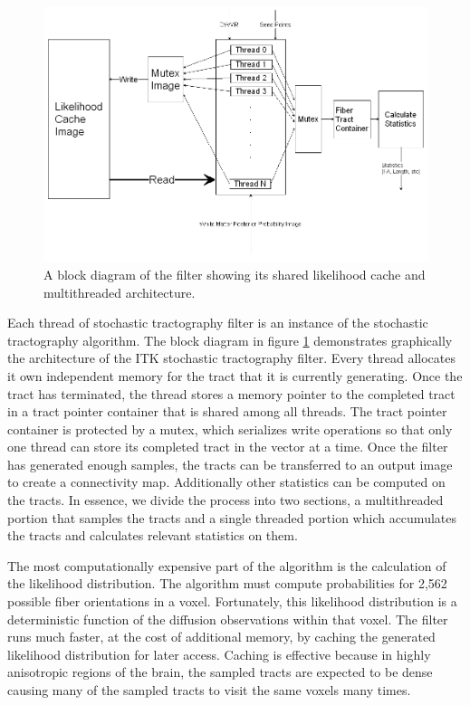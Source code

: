 \begin{figure}[t]
  \center
	\includegraphics[width=\linewidth]{filterblock}
	\caption{A block diagram of the filter showing its shared likelihood cache and multithreaded architecture.}
	\label{fig:filterblock}
\end{figure}

Each thread of stochastic tractography filter is an instance of the stochastic tractography algorithm. The block diagram in figure \ref{fig:filterblock} demonstrates graphically the architecture of the ITK stochastic tractography filter.  Every thread allocates it own independent memory for the tract that it is currently generating.  Once the tract has terminated, the thread stores a memory pointer to the completed tract in a tract pointer container that is shared among all threads.  The tract pointer container is protected by a mutex, which serializes write operations so that only one thread can store its completed tract in the vector at a time.  Once the filter has generated enough samples, the tracts can be transferred to an output image to create a connectivity map.  Additionally other statistics can be computed on the tracts.  In essence, we divide the process into two sections, a multithreaded portion that samples the tracts and a single threaded portion which accumulates the tracts and calculates relevant statistics on them.

The most computationally expensive part of the algorithm is the calculation of the likelihood distribution.  The algorithm must compute probabilities for 2,562 possible fiber orientations in a voxel.  Fortunately, this likelihood distribution is a deterministic function of the diffusion observations within that voxel.  The filter runs much faster, at the cost of additional memory, by caching the generated likelihood distribution for later access.  Caching is effective because in highly anisotropic regions of the brain, the sampled tracts are expected to be dense causing many of the sampled tracts to visit the same voxels many times.

